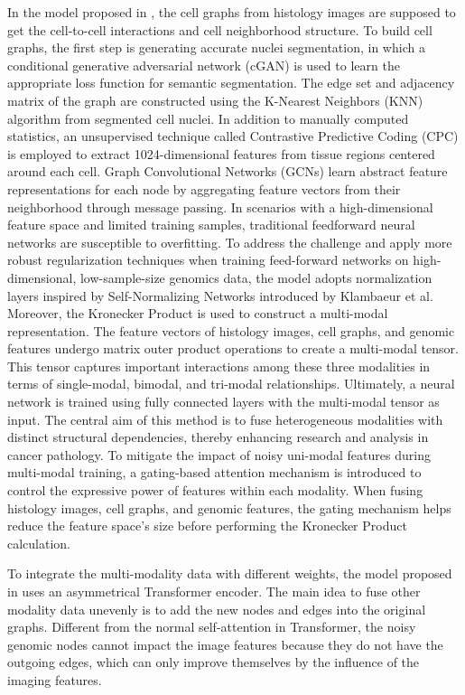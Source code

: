 \documentclass[journal,twoside,web]{ieeecolor}
\begin{document}
In the model proposed in \cite{chen2020pathomic}, the cell graphs from histology images are supposed to get the cell-to-cell interactions and cell neighborhood structure.
To build cell graphs, the first step is generating accurate nuclei segmentation, in which a conditional generative adversarial network (cGAN) is used to learn the appropriate loss function for semantic segmentation.
The edge set and adjacency matrix of the graph are constructed using the K-Nearest Neighbors (KNN) algorithm from segmented cell nuclei.
In addition to manually computed statistics, an unsupervised technique called Contrastive Predictive Coding (CPC) is employed to extract 1024-dimensional features from tissue regions centered around each cell.
Graph Convolutional Networks (GCNs) learn abstract feature representations for each node by aggregating feature vectors from their neighborhood through message passing.
In scenarios with a high-dimensional feature space and limited training samples, traditional feedforward neural networks are susceptible to overfitting. 
To address the challenge and apply more robust regularization techniques when training feed-forward networks on high-dimensional, low-sample-size genomics data, the model adopts normalization layers inspired by Self-Normalizing Networks introduced by Klambaeur et al\cite{klambauer2017self}.
Moreover, the Kronecker Product is used to construct a multi-modal representation. 
The feature vectors of histology images, cell graphs, and genomic features undergo matrix outer product operations to create a multi-modal tensor. 
This tensor captures important interactions among these three modalities in terms of single-modal, bimodal, and tri-modal relationships.
Ultimately, a neural network is trained using fully connected layers with the multi-modal tensor as input. 
The central aim of this method is to fuse heterogeneous modalities with distinct structural dependencies, thereby enhancing research and analysis in cancer pathology. 
To mitigate the impact of noisy uni-modal features during multi-modal training, a gating-based attention mechanism\cite{arevalo2017gated} is introduced to control the expressive power of features within each modality. 
When fusing histology images, cell graphs, and genomic features, the gating mechanism helps reduce the feature space's size before performing the Kronecker Product calculation.

To integrate the multi-modality data with different weights, the model proposed in \cite{wang2021ammasurv} uses an asymmetrical Transformer encoder.
The main idea to fuse other modality data unevenly is to add the new nodes and edges into the original graphs.
Different from the normal self-attention in Transformer, the noisy genomic nodes cannot impact the image features because they do not have the outgoing edges, which can only improve themselves by the influence of the imaging features.
\end{document}

